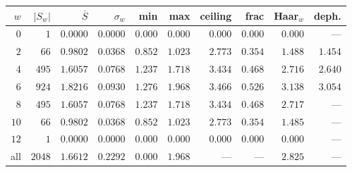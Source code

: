 \begin{tabular}{rrrrrrrrrr}
\hline
$w$ & $|S_w|$ & $\overline{S}$ & $\sigma_w$ & min & max & ceiling & frac & Haar$_w$ & deph. \\
\hline
$0$ & $1$ & $0.0000$ & $0.0000$ & $0.000$ & $0.000$ & $0.000$ & $0.000$ & $0.000$ & --- \\
$2$ & $66$ & $0.9802$ & $0.0368$ & $0.852$ & $1.023$ & $2.773$ & $0.354$ & $1.488$ & $1.454$ \\
$4$ & $495$ & $1.6057$ & $0.0768$ & $1.237$ & $1.718$ & $3.434$ & $0.468$ & $2.716$ & $2.640$ \\
$6$ & $924$ & $1.8216$ & $0.0930$ & $1.276$ & $1.968$ & $3.466$ & $0.526$ & $3.138$ & $3.054$ \\
$8$ & $495$ & $1.6057$ & $0.0768$ & $1.237$ & $1.718$ & $3.434$ & $0.468$ & $2.717$ & --- \\
$10$ & $66$ & $0.9802$ & $0.0368$ & $0.852$ & $1.023$ & $2.773$ & $0.354$ & $1.485$ & --- \\
$12$ & $1$ & $0.0000$ & $0.0000$ & $0.000$ & $0.000$ & $0.000$ & $0.000$ & $0.000$ & --- \\
\hline
all & $2048$ & $\mathbf{1.6612}$ & $0.2292$ & $0.000$ & $1.968$ & --- & --- & $2.825$ & --- \\
\hline
\end{tabular}
